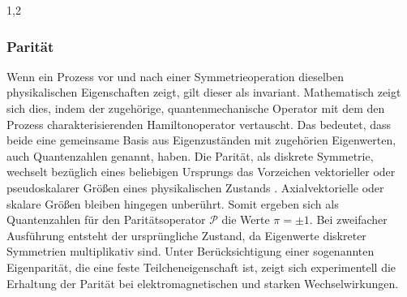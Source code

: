 \documentclass[11pt,a4paper,twoside]{report}
\begin{document}
\begin{spacing}{1,2}
\subsubsection{Parität}
\label{sec_parity}
Wenn ein Prozess vor und nach einer Symmetrieoperation dieselben physikalischen Eigenschaften zeigt, gilt dieser als invariant. Mathematisch zeigt sich
dies, indem der zugehörige, quantenmechanische Operator mit dem den Prozess charakterisierenden Hamiltonoperator vertauscht. Das bedeutet, dass beide eine
gemeinsame Basis aus Eigenzuständen mit zugehörien Eigenwerten, auch Quantenzahlen genannt, haben. Die Parität, als diskrete Symmetrie, wechselt bezüglich 
eines beliebigen Ursprungs das Vorzeichen vektorieller oder pseudoskalarer Größen eines physikalischen Zustands \cite{Klapdor}. Axialvektorielle oder skalare Größen bleiben
hingegen unberührt. Somit ergeben sich als Quantenzahlen für den Paritätsoperator $\mathcal{P}$ die Werte $\pi = \pm1$. Bei zweifacher Ausführung entsteht 
der ursprüngliche Zustand, da Eigenwerte diskreter Symmetrien multiplikativ sind. Unter Berücksichtigung einer sogenannten Eigenparität, die eine feste
Teilcheneigenschaft ist, zeigt sich experimentell die Erhaltung der Parität bei elektromagnetischen und starken Wechselwirkungen.


\end{spacing}
\end{document}
